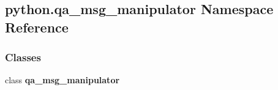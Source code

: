 \subsection{python.\+qa\+\_\+msg\+\_\+manipulator Namespace Reference}
\label{namespacepython_1_1qa__msg__manipulator}
\subsubsection*{Classes}
\begin{DoxyCompactItemize}
\item 
class {\bf qa\+\_\+msg\+\_\+manipulator}
\end{DoxyCompactItemize}
